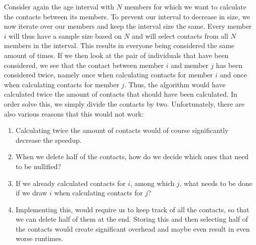 \begin{example}
\label{ex:fs_wrong2}
Consider again the age interval with $N$ members for which we want to calculate the contacts between its members. To prevent our interval to decrease in size, we now iterate over our members and keep the interval size the same. Every member $i$ will thus have a sample size based on $N$ and will select contacts from all $N$ members in the interval. This results in everyone being considered the same amount of times. If we then look at the pair of individuals that have been considered, we see that the contact between member $i$ and member $j$ has been considered twice, namely once when calculating contacts for member $i$ and once when calculating contacts for member $j$. Thus, the algorithm would have calculated twice the amount of contacts that should have been calculated. In order solve this, we simply divide the contacts by two. Unfortunately, there are also various reasons that this would not work:
\begin{enumerate}
    \item Calculating twice the amount of contacts would of course significantly decrease the speedup.
    \item When we delete half of the contacts, how do we decide which ones that need to be nullified?
    \item If we already calculated contacts for $i$, among which $j$, what needs to be done if we draw $i$ when calculating contacts for $j$?
    \item Implementing this, would require us to keep track of all the contacts, so that we can delete half of them at the end. Storing this and then selecting half of the contacts would create significant overhead and maybe even result in even worse runtimes.
\end{enumerate}
\end{example}


